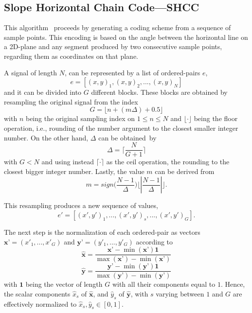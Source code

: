 \documentclass[brainsci,article,accept,moreauthors,pdftex,10pt,a4paper]{mdpi}
\begin{document}
\subsection{Slope Horizontal Chain Code---SHCC}

This algorithm~\citep{Alvarado-Gonzalez2016} proceeds by generating a coding scheme from a sequence of sample points. This encoding is based on the angle between the horizontal line on a 2D-plane and any segment produced by two consecutive sample points, regarding them as coordinates on that plane.  

A signal of length $N$, can be represented by a list of ordered-pairs $e$,
\begin{equation}
e = \left[ (x,y)_{1}, (x,y)_{2}, ..., (x,y)_{N} \right]
\label{eq:shccdelta}
\end{equation}
and it can be divided into $G$ different blocks.  These blocks are obtained by resampling the original signal from the index 
\begin{equation}
G = \lfloor n + ( m \Delta ) + 0.5 \rfloor
\label{eq:shcc2}
\end{equation}
with $n$ being the original sampling index on $ 1 \leq n \leq N $ and $\lfloor \cdot \rfloor$ being the floor operation, i.e., rounding of the number argument to the closest smaller integer number.  On the other hand, $\Delta$ can be obtained~by
\begin{equation}
\Delta = \bigg \lceil \frac{N}{G+1} \bigg \rceil
\label{eq:shcc3}
\end{equation}
with $ G < N $ and using instead $\lceil \cdot \rceil$ as the ceil operation, the rounding to the closest bigger integer number. Lastly, the value $m$ can be derived from
\begin{equation}
m = sign \bigg (  \frac{N-1}{\Delta} \bigg )  \bigg \lfloor \left\lvert \frac{N-1}{\Delta} \right\lvert \bigg \rfloor.
\label{eq:shcc4}
\end{equation}

This resampling produces a new sequence of values,
\begin{equation}
e' = \left[ (x',y')_{1}, ...,(x',y')_{s}, ..., (x',y')_{G} \right].
\label{eq:shcc5}
\end{equation}

The next step is the normalization of each ordered-pair as vectors $\textbf{x'} = (x'_{1},...,x'_{G})$ and $\textbf{y'} = (y'_{1},...,y'_{G})$ according to
\begin{equation}
\hat{\textbf{x}} = \frac{\textbf{x'} - \min(\textbf{x'}) \textbf{1} }{\max(\textbf{x'}) - \min(\textbf{x'})} 
\label{eq:shcc6}
\end{equation}
\begin{equation}
\hat{\textbf{y}} = \frac{ \textbf{y'} - \min(\textbf{y'}) \textbf{1}}{\max(\textbf{y'}) - \min(\textbf{y'})} 
\label{eq:shcc7}
\end{equation}
with $\textbf{1}$ being the vector of length $G$ with all their components equal to $1$.  Hence, the scalar components $\hat{x}_{s}$ of $\hat{\textbf{x}}$, and $\hat{y}_{s}$ of $\hat{\textbf{y}}$, with $s$ varying between $1$ and $G$ are effectively normalized to $\hat{x}_{s},\hat{y}_{s} \in [0,1]$. 
\end{document}
